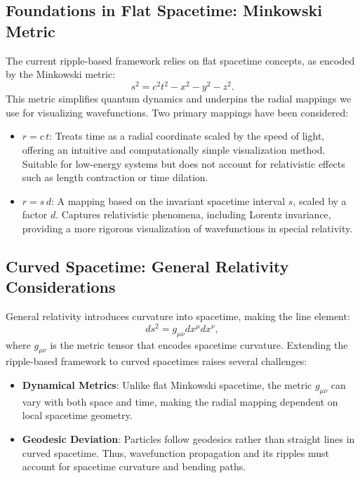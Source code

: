 \documentclass{article}
\begin{document}
\subsection{Foundations in Flat Spacetime: Minkowski Metric}
The current ripple-based framework relies on flat spacetime concepts, as encoded by the Minkowski metric:
\[
s^2 = c^2 t^2 - x^2 - y^2 - z^2.
\]
This metric simplifies quantum dynamics and underpins the radial mappings we use for visualizing wavefunctions. Two primary mappings have been considered:
\begin{itemize}
    \item \textbf{\(r = c\,t\)}:
    Treats time as a radial coordinate scaled by the speed of light, offering an intuitive and computationally simple visualization method. 
    Suitable for low-energy systems but does not account for relativistic effects such as length contraction or time dilation.
    \item \textbf{\(r = s\,d\)}:
    A mapping based on the invariant spacetime interval \(s\), scaled by a factor \(d\).
    Captures relativistic phenomena, including Lorentz invariance, providing a more rigorous visualization of wavefunctions in special relativity.
\end{itemize}

\subsection{Curved Spacetime: General Relativity Considerations}
General relativity introduces curvature into spacetime, making the line element:
\[
ds^2 = g_{\mu\nu} dx^\mu dx^\nu,
\]
where \(g_{\mu\nu}\) is the metric tensor that encodes spacetime curvature. Extending the ripple-based framework to curved spacetimes raises several challenges:

\begin{itemize}
    \item \textbf{Dynamical Metrics}:
    Unlike flat Minkowski spacetime, the metric \(g_{\mu\nu}\) can vary with both space and time, making the radial mapping dependent on local spacetime geometry.

    \item \textbf{Geodesic Deviation}:
    Particles follow geodesics rather than straight lines in curved spacetime. Thus, wavefunction propagation and its ripples must account for spacetime curvature and bending paths.
\end{itemize}
\end{document}
